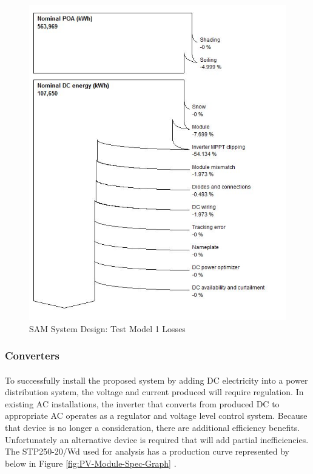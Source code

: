 \begin{figure}[H]
\hfill\includegraphics[width = 120mm]{images/sam-1-system-losses}\hspace*{\fill}
\caption{SAM System Design: Test Model 1 Losses} 
\label{fig:SAM-Model-2}
\end{figure}


\subsubsection{Converters}

\paragraph{}
To successfully install the proposed system by adding DC electricity into a power distribution system, the voltage and current produced will require regulation. In existing AC installations, the inverter that converts from produced DC to appropriate AC operates as a regulator and voltage level control system. Because that device is no longer a consideration, there are additional efficiency benefits. Unfortunately an alternative device is required that will add partial inefficiencies. The STP250-20/Wd used for analysis has a production curve represented by below in Figure \ref{fig:PV-Module-Spec-Graph} \cite{website:SuntechModule}.

